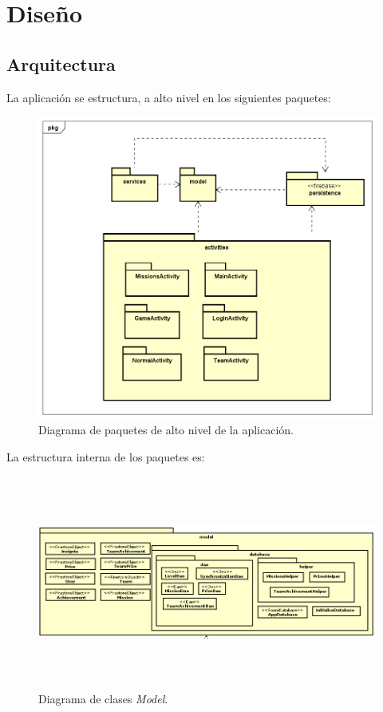 \documentclass[twoside]{report}
\begin{document}
\clearpage

\section{Diseño}
\subsection{Arquitectura}
La aplicación se estructura, a alto nivel en los siguientes paquetes:
\begin{figure}[H]
\centering
\includegraphics[scale=0.5]{images/structureHighLevel}
\caption{Diagrama de paquetes de alto nivel de la aplicación.}
\end{figure}

\clearpage

La estructura interna de los paquetes es:

\begin{figure}[H]
\centering
\includegraphics[height=7cm,width=\textwidth]{images/structureModel.PNG}
\caption{Diagrama de clases \textit{Model}.}
\end{figure}
\end{document}

